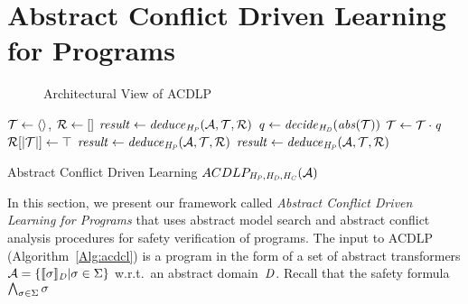 \section{Abstract Conflict Driven Learning for Programs}
%
%
\begin{figure}[htbp]
\centering
\vspace*{-0.2cm}
\caption{Architectural View of ACDLP \label{conflict}}
\end{figure}
%
\begin{algorithm2e}[t]
\DontPrintSemicolon
{}
\begin{small}
$\mathcal{T} \leftarrow \langle\rangle$, $\mathcal{R} \leftarrow []$ \;
$\mathit{result} \leftarrow \mathit{deduce}_{\mathit{H_P}}(\mathcal{A},\mathcal{T},\mathcal{R})$ \;
 {
  \return \safe}
{
 {
  \return \unsafe}
  $\mathit{q} \leftarrow \mathit{decide}_{\mathit{H_D}}(\mathit{abs}(\mathcal{T}))$ \;
  $\mathcal{T} \leftarrow \mathcal{T} \cdot \mathit{q}$ \; 
  $\mathcal{R}[|\mathcal{T}|] \leftarrow \top$ \;
  $\mathit{result} \leftarrow \mathit{deduce}_{\mathit{H_P}}(\mathcal{A},\mathcal{T},\mathcal{R})$\;
   {
    \lIf{$\neg \analyzeconflict_{\confheur}(\abstransset,\trail,\reasons)$} {
      \return \safe
    }
    $\mathit{result} \leftarrow \mathit{deduce}_{\mathit{H_P}}(\mathcal{A},\mathcal{T},\mathcal{R})$ \;
  }
}
\end{small}
\caption{Abstract Conflict Driven Learning $ACDLP_{\mathit{H_P},\mathit{H_D},\mathit{H_C}}(\mathcal{A})$ \label{Alg:acdcl}}
\end{algorithm2e}
%
In this section, we present our framework called \emph{Abstract Conflict 
Driven Learning for Programs} that uses abstract model search and abstract 
conflict analysis procedures for safety verification of programs. 
The input to ACDLP (Algorithm~\ref{Alg:acdcl}) is a
program in the form of a set of abstract transformers
$\mathcal{A}=\{\llbracket \sigma \rrbracket_{\mathit{D}}|\sigma\in\Sigma\}$
w.r.t.\ an abstract domain~$\mathit{D}$.  Recall that the safety 
formula $\bigwedge_{\sigma\in\Sigma} \sigma$ 
